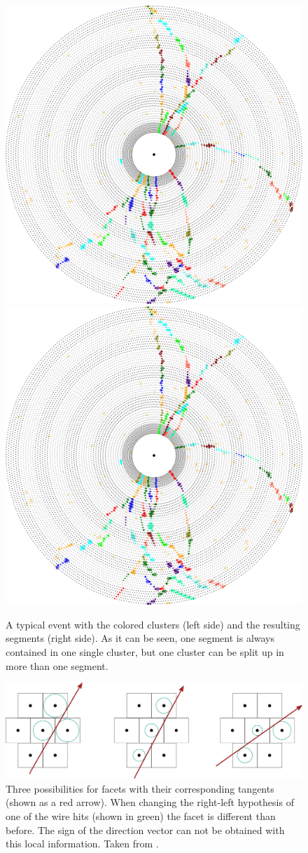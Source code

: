 \begin{figure}
  \centering
  \includegraphics[width=0.4\linewidth]{figures/theory/segments.png} 
  \hspace*{0.1\linewidth}
  \includegraphics[width=0.4\linewidth]{figures/theory/segments.png}
  \caption[Clusters and resulting segments in the automaton track finder.]{A typical event with the colored clusters (left side) and the resulting segments (right side). As it can be seen, one segment is always contained in one single cluster, but one cluster can be split up in more than one segment.}
  \label{fig-clusters-and-segments}
\end{figure}

\begin{figure}
  \centering
  \includegraphics[width=\linewidth]{figures/theory/facets.pdf}
  \caption[Facets used in the automaton track finder.]{Three possibilities for facets with their corresponding tangents (shown as a red arrow). When changing the right-left hypothesis of one of the wire hits (shown in green) the facet is different than before. The sign of the direction vector can not be obtained with this local information. Taken from \cite{oliver}.}
  \label{fig-facets}
\end{figure}

